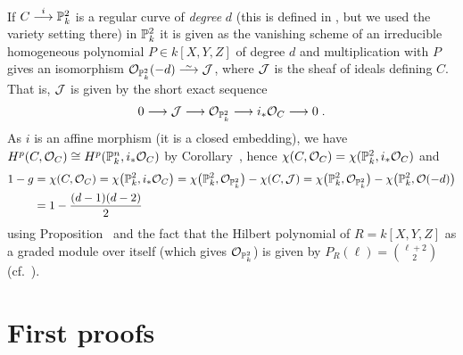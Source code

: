 \documentclass[a4paper,parskip=half,numbers=enddot, DIV=12]{scrreprt}
\begin{document}
\begin{example}
	If $C\morphism[i]\IP^2_k$ is a regular curve of \emph{degree} $d$ (this is defined in \cite[Definition~3.1.5]{alg2}, but we used the variety setting there) in $\mathbb{P}_k^2$ it is given as the vanishing scheme of an irreducible homogeneous polynomial $P\in k[X,Y,Z]$ of degree $d$ and multiplication with $P$ gives an isomorphism $\Oo_{\IP_k^2}(-d)\isomorphism\Jj$, where $\mathcal{J}$ is the sheaf of ideals defining $C$. That is, $\mathcal{J}$ is given by the short exact sequence
	\begin{align*}
		0\morphism \Jj\morphism\Oo_{\IP_k^2}\morphism i_*\Oo_C\morphism 0\;.
	\end{align*}
	As $i$ is an affine morphism (it is a closed embedding), we have $H^p(C,\mathcal{O}_C)\cong H^p(\mathbb{P}_k^n,i_*\mathcal{O}_C)$ by Corollary~, hence $\chi(C,\mathcal{O}_C)=\chi(\mathbb{P}_k^2,i_*\mathcal{O}_C)$ and 
	\begin{align*}
		1-g&=\chi(C,\mathcal{O}_C)=\chi\big(\mathbb{P}_k^2,i_*\mathcal{O}_C\big)=\chi\big(\mathbb{P}_k^2,\mathcal{O}_{\mathbb{P}_k^2}\big)-\chi(C,\mathcal{J})=\chi\big(\mathbb{P}_k^2,\mathcal{O}_{\mathbb{P}_k^2}\big)-\chi\big(\mathbb{P}_k^2,\mathcal{O}(-d)\big)\\
		&=1-\frac{(d-1)(d-2)}{2}
	\end{align*}
	using Proposition~ and the fact that the Hilbert polynomial of $R=k[X,Y,Z]$ as a graded module over itself (which gives $\mathcal{O}_{\mathbb{P}_k^2}$) is given by $P_R(\ell)=\binom{\ell+2}{2}$ (cf.\ \cite[Lemma~3.0.1]{alg2}).
\end{example}
\section{First proofs}
\end{document}
